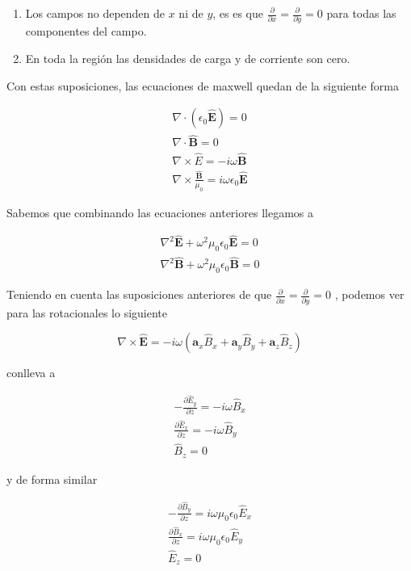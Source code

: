 \begin{enumerate}
    \item Los campos no dependen de $x$ ni de $y$, es es que $\frac{\partial }{\partial x} = \frac{\partial }{\partial y} = 0$ para todas las componentes del campo.
    \item En toda la región las densidades de carga y de corriente son cero.
\end{enumerate}

Con estas suposiciones, las ecuaciones de maxwell quedan de la siguiente forma

\begin{eqnarray*}
\nabla \cdot (\epsilon_0 \mathbf{\hat{E}} ) = 0 \\
\nabla \cdot \mathbf{\hat{B}} = 0 \\
\nabla \times \hat{E} = - i \omega \mathbf{\hat{B}} \\
\nabla \times \frac{\mathbf{\hat{B}}}{\mu_0} = i \omega \epsilon_0 \mathbf{\hat{E}}
\end{eqnarray*}

Sabemos que combinando las ecuaciones anteriores llegamos a 

\begin{eqnarray*}
\nabla^2 \mathbf{\hat{E}} + \omega^2 \mu_0\epsilon_0 \mathbf{\hat{E}} = 0\\
\nabla^2 \mathbf{\hat{B}} + \omega^2 \mu_0\epsilon_0 \mathbf{\hat{B}} = 0
\end{eqnarray*}


Teniendo en cuenta las suposiciones anteriores de que  $\frac{\partial }{\partial x} = \frac{\partial }{\partial y} = 0$ , podemos ver para las rotacionales lo siguiente

\begin{equation*}
\nabla \times \mathbf{\hat{E}} = - i \omega (\mathbf{a}_x \hat{B}_x + \mathbf{a}_y \hat{B}_y  + \mathbf{a}_z \hat{B}_z )
\end{equation*}

conlleva a 

\begin{eqnarray*}
-\frac{\partial \hat{E}_y}{\partial z} = - i \omega \hat{B}_x \\
\frac{\partial \hat{E}_x}{\partial z} = - i \omega \hat{B}_y \\
\hat{B}_z = 0
\end{eqnarray*}

y de forma similar 


\begin{eqnarray*}
-\frac{\partial \hat{B}_y}{\partial z} = i \omega \mu_0\epsilon_0 \hat{E}_x \\
\frac{\partial \hat{B}_x}{\partial z} = i \omega \mu_0\epsilon_0 \hat{E}_y \\
\hat{E}_z = 0
\end{eqnarray*}

